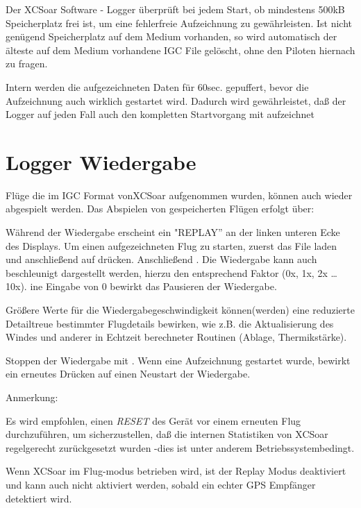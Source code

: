 Der \textsf{XCSoar}  Software - Logger überprüft bei jedem Start, ob mindestens 500kB Speicherplatz frei ist, um eine fehlerfreie Aufzeichnung zu gewährleisten. \textcolor[rgb]{0.00,0.25,0.50}{Ist nicht genügend Speicherplatz auf dem Medium vorhanden, so wird automatisch der älteste auf dem Medium vorhandene IGC File gelöscht, ohne den Piloten hiernach zu fragen.}

Intern werden die aufgezeichneten Daten für 60sec. gepuffert, bevor die Aufzeichnung auch wirklich gestartet wird.  Dadurch wird gewährleistet, daß der Logger auf jeden Fall auch den kompletten Startvorgang mit aufzeichnet

\section{Logger Wiedergabe}
Flüge die im IGC Format von\textsf{XCSoar} aufgenommen wurden,  können   auch wieder abgespielt werden. Das Abspielen von gespeicherten Flügen erfolgt über:

Während der Wiedergabe erscheint ein "REPLAY'' an der linken unteren Ecke des Displays.
Um einen aufgezeichneten Flug zu starten, zuerst das File laden und anschließend auf  drücken. Anschließend . Die Wiedergabe kann auch beschleunigt dargestellt werden, hierzu den entsprechend Faktor  (0x, 1x, 2x \dots 10x).
 ine Eingabe von 0 bewirkt das Pausieren der Wiedergabe.

Größere Werte für die Wiedergabegeschwindigkeit können(werden) eine reduzierte Detailtreue  bestimmter Flugdetails bewirken, wie z.B. die Aktualisierung des Windes und anderer in Echtzeit berechneter Routinen (Ablage, Thermikstärke).

Stoppen der Wiedergabe mit  .
Wenn eine Aufzeichnung gestartet wurde, bewirkt ein erneutes Drücken auf  einen Neustart der Wiedergabe.

Anmerkung:

Es wird empfohlen, einen \textsl{RESET}  des  Gerät vor einem erneuten Flug durchzuführen, um sicherzustellen, daß die internen Statistiken von \textsf{XCSoar} regelgerecht zurückgesetzt wurden -dies ist unter anderem Betriebssystembedingt.

Wenn \textsf{XCSoar} im Flug-modus betrieben wird, ist der Replay Modus deaktiviert und kann auch nicht aktiviert werden, sobald ein echter GPS Empfänger detektiert wird.

